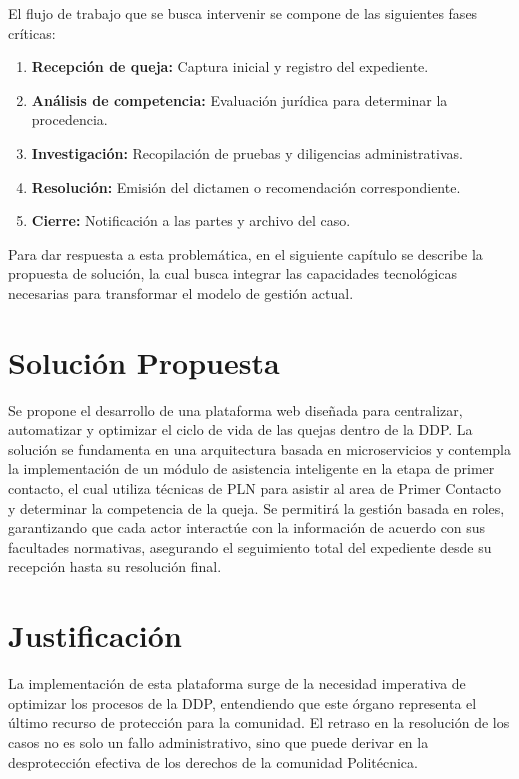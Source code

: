 El flujo de trabajo que se busca intervenir se compone de las siguientes fases críticas:

\begin{enumerate}
\item \textbf{Recepción de queja:} Captura inicial y registro del expediente.
\item \textbf{Análisis de competencia:} Evaluación jurídica para determinar la procedencia.
\item \textbf{Investigación:} Recopilación de pruebas y diligencias administrativas.
\item \textbf{Resolución:} Emisión del dictamen o recomendación correspondiente.
\item \textbf{Cierre:} Notificación a las partes y archivo del caso.
\end{enumerate}

Para dar respuesta a esta problemática, en el siguiente capítulo se describe la propuesta de solución, la cual busca integrar las capacidades tecnológicas necesarias para transformar el modelo de gestión actual.

\section{Solución Propuesta}
Se propone el desarrollo de una plataforma web diseñada para centralizar, automatizar y optimizar el ciclo de vida de las quejas dentro de la DDP. La solución se fundamenta en una arquitectura basada en microservicios y contempla la implementación de un módulo de asistencia inteligente en la etapa de primer contacto, el cual utiliza técnicas de PLN para asistir al area de Primer Contacto y determinar la competencia de la queja. Se permitirá la gestión basada en roles, garantizando que cada actor interactúe con la información de acuerdo con sus facultades normativas, asegurando el seguimiento total del expediente desde su recepción hasta su resolución final.

\section{Justificación}
La implementación de esta plataforma surge de la necesidad imperativa de optimizar los procesos de la DDP, entendiendo que este órgano representa el último recurso de protección para la comunidad. El retraso en la resolución de los casos no es solo un fallo administrativo, sino que puede derivar en la desprotección efectiva de los derechos de la comunidad Politécnica.

